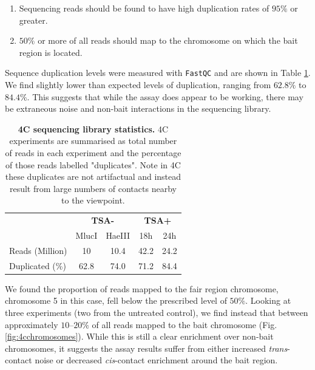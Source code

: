 \documentclass[a4paper,11pt,oneside]{book}
\begin{document}
\begin{enumerate}
\item Sequencing reads should be found to have high duplication rates of $95\%$ or greater.
\item $50\%$ or more of all reads should map to the chromosome on which the bait region is located.
\end{enumerate}


Sequence duplication levels were measured with \texttt{FastQC}\cite{fastqc} and are shown in Table \ref{tab:4c}. We find slightly lower than expected levels of duplication, ranging from $62.8\%$ to $84.4\%$. This suggests that while the assay does appear to be working, there may be extraneous noise and non-bait interactions in the sequencing library.

\begin{table}[]
\centering
\caption[4C sequencing library statistics.]{ {\bf 4C sequencing library statistics.}
4C experiments are summarised as total number of reads in each experiment and the percentage of those reads labelled "duplicates". Note in 4C these duplicates are not artifactual and instead result from large numbers of contacts nearby to the viewpoint.
}
\label{tab:4c}
\begin{tabular}{lcccc}
                                      & \multicolumn{2}{c}{{\bf TSA-}}      & \multicolumn{2}{c}{{\bf TSA+}}   \\ \cline{2-5} 
\multicolumn{1}{l|}{}                 & MlucI & \multicolumn{1}{c|}{HaeIII} & 18h  & \multicolumn{1}{c|}{24h}  \\ \hline
\multicolumn{1}{|l|}{Reads (Million)} & 10    & \multicolumn{1}{c|}{10.4}   & 42.2 & \multicolumn{1}{c|}{24.2} \\ \cline{2-5} 
\multicolumn{1}{|l|}{Duplicated (\%)} & 62.8  & \multicolumn{1}{c|}{74.0}   & 71.2 & \multicolumn{1}{c|}{84.4} \\ \hline
\end{tabular}
\end{table}

We found the proportion of reads mapped to the fair region chromosome, chromosome 5 in this case, fell below the prescribed level of $50\%$. Looking at three experiments (two from the untreated control), we find instead that between approximately $10$--$20\%$ of all reads mapped to the bait chromosome (Fig. \ref{fig:4cchromosomes}). While this is still a clear enrichment over non-bait chromosomes, it suggests the assay results suffer from either increased \emph{trans}-contact noise or decreased \emph{cis}-contact enrichment around the bait region. 
\end{document}
